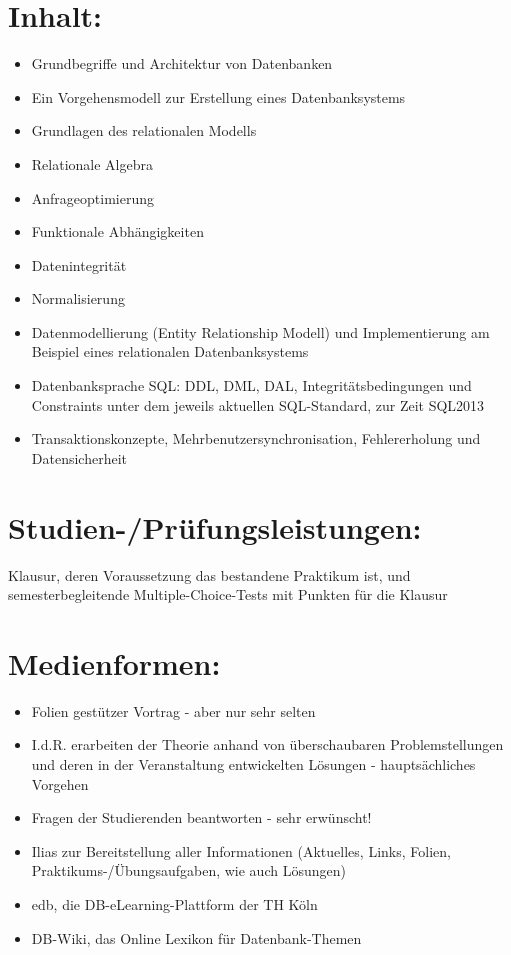 \section*{Inhalt:}\label{inhalt-7}

\begin{itemize}
\item
  Grundbegriffe und Architektur von Datenbanken
\item
  Ein Vorgehensmodell zur Erstellung eines Datenbanksystems
\item
  Grundlagen des relationalen Modells
\item
  Relationale Algebra
\item
  Anfrageoptimierung
\item
  Funktionale Abhängigkeiten
\item
  Datenintegrität
\item
  Normalisierung
\item
  Datenmodellierung (Entity Relationship Modell) und Implementierung am
  Beispiel eines relationalen Datenbanksystems
\item
  Datenbanksprache SQL: DDL, DML, DAL, Integritätsbedingungen und
  Constraints unter dem jeweils aktuellen SQL-Standard, zur Zeit SQL2013
\item
  Transaktionskonzepte, Mehrbenutzersynchronisation, Fehlererholung und
  Datensicherheit
\end{itemize}

\section*{Studien-/Prüfungsleistungen:}\label{studien-pruxfcfungsleistungen-4}

Klausur, deren Voraussetzung das bestandene Praktikum ist, und
semesterbegleitende Multiple-Choice-Tests mit Punkten für die Klausur

\section*{Medienformen:}\label{medienformen-2}

\begin{itemize}
\item
  Folien gestützer Vortrag - aber nur sehr selten
\item
  I.d.R. erarbeiten der Theorie anhand von überschaubaren
  Problemstellungen und deren in der Veranstaltung entwickelten Lösungen
  - hauptsächliches Vorgehen
\item
  Fragen der Studierenden beantworten - sehr erwünscht!
\item
  Ilias zur Bereitstellung aller Informationen (Aktuelles, Links,
  Folien, Praktikums-/Übungsaufgaben, wie auch Lösungen)
\item
  edb, die DB-eLearning-Plattform der TH Köln
\item
  DB-Wiki, das Online Lexikon für Datenbank-Themen
\end{itemize}

